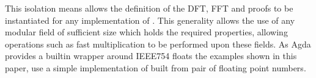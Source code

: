 This isolation means allows the definition of the DFT, FFT and proofs to be instantiated
for any implementation of .
This generality allows the use of any modular field of 
sufficient size which holds the required properties, allowing operations such as 
fast multiplication to be performed upon these fields.
As Agda provides a builtin wrapper around IEEE754 floats\cite{IEEE754}
the examples shown in this paper, use a simple implementation of  built 
from pair of floating point numbers.
\begin{AgdaMultiCode}
\begin{code}[hide]%
\>[0]\AgdaSpace{}%
\AgdaSpace{}%
\AgdaSymbol{(}\AgdaSpace{}%
\AgdaSymbol{:}\AgdaSpace{}%
\AgdaSymbol{)}\AgdaSpace{}%
\<%
\\
\>[0][@{}l@{\AgdaIndent{0}}]%
\>[2]\AgdaSpace{}%
\AgdaSpace{}%
\AgdaSpace{}%
\AgdaSpace{}%
\AgdaSymbol{(}\AgdaSymbol{;}\AgdaSpace{}%
\AgdaSymbol{;}\AgdaSpace{}%
\AgdaSymbol{;}\AgdaSpace{}%
\AgdaSymbol{)}\<%
\\
%
\\[\AgdaEmptyExtraSkip]%
%
\>[2]\AgdaSpace{}%
\AgdaSpace{}%
\AgdaSpace{}%
\<%
\\
%
\>[2]\AgdaSpace{}%
\AgdaSpace{}%
\AgdaSpace{}%
\<%
\\
%
\\[\AgdaEmptyExtraSkip]%
%
\>[2]\<%
\\
\>[2][@{}l@{\AgdaIndent{0}}]%
\>[4]\<%
\\
\>[4][@{}l@{\AgdaIndent{0}}]%
\>[6]\AgdaSpace{}%
\AgdaSpace{}%
\AgdaSpace{}%
\AgdaSpace{}%
\AgdaSpace{}%
\AgdaSpace{}%
\AgdaSpace{}%
\AgdaSymbol{:}\AgdaSpace{}%
\<%
\\
%
\>[4]%
\>[15]\<%
\\
\>[4][@{}l@{\AgdaIndent{0}}]%
\>[6]\AgdaSpace{}%

\end{code}
\end{AgdaMultiCode}
